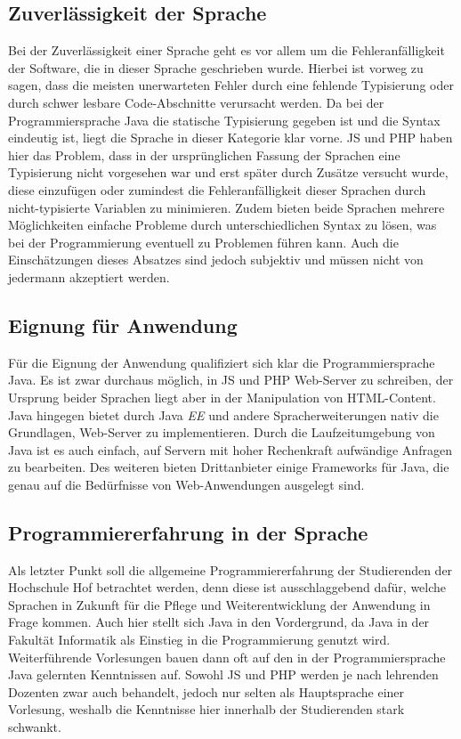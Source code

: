 \subsection*{Zuverlässigkeit der Sprache} 

Bei der Zuverlässigkeit einer Sprache geht es vor allem um die Fehleranfälligkeit der Software, die in dieser Sprache geschrieben wurde. Hierbei ist vorweg zu sagen, dass die meisten unerwarteten Fehler durch eine fehlende Typisierung oder durch schwer lesbare Code-Abschnitte verursacht werden. Da bei der Programmiersprache Java die statische Typisierung gegeben ist und die Syntax eindeutig ist, liegt die Sprache in dieser Kategorie klar vorne. \ac{JS} und \ac{PHP} haben hier das Problem, dass in der ursprünglichen Fassung der Sprachen eine Typisierung nicht vorgesehen war und erst später durch Zusätze versucht wurde, diese einzufügen oder zumindest die Fehleranfälligkeit dieser Sprachen durch nicht-typisierte Variablen zu minimieren. Zudem bieten beide Sprachen mehrere Möglichkeiten einfache Probleme durch unterschiedlichen Syntax zu lösen, was bei der Programmierung eventuell zu Problemen führen kann. Auch die Einschätzungen dieses Absatzes sind jedoch subjektiv und müssen nicht von jedermann akzeptiert werden.

\subsection*{Eignung für Anwendung} 

Für die Eignung der Anwendung qualifiziert sich klar die Programmiersprache Java. Es ist zwar durchaus möglich, in \ac{JS} und \ac{PHP} Web-Server zu schreiben, der Ursprung beider Sprachen liegt aber in der Manipulation von \ac{HTML}-Content. Java hingegen bietet durch Java \textit{EE} und andere Spracherweiterungen nativ die Grundlagen, Web-Server zu implementieren. Durch die Laufzeitumgebung von Java ist es auch einfach, auf Servern mit hoher Rechenkraft aufwändige Anfragen zu bearbeiten. Des weiteren bieten Drittanbieter einige Frameworks für Java, die genau auf die Bedürfnisse von Web-Anwendungen ausgelegt sind.

\subsection*{Programmiererfahrung in der Sprache} 

Als letzter Punkt soll die allgemeine Programmiererfahrung der Studierenden der Hochschule Hof betrachtet werden, denn diese ist ausschlaggebend dafür, welche Sprachen in Zukunft für die Pflege und Weiterentwicklung der Anwendung in Frage kommen. Auch hier stellt sich Java in den Vordergrund, da Java in der Fakultät Informatik als Einstieg in die Programmierung genutzt wird. Weiterführende Vorlesungen bauen dann oft auf den in der Programmiersprache Java gelernten Kenntnissen auf. Sowohl \ac{JS} und \ac{PHP} werden je nach lehrenden Dozenten zwar auch behandelt, jedoch nur selten als Hauptsprache einer Vorlesung, weshalb die Kenntnisse hier innerhalb der Studierenden stark schwankt.

